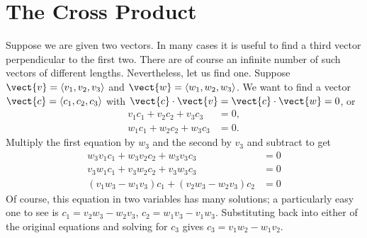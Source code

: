 \section{The Cross Product}\label{sec:3Dcrossproduct}

Suppose we are given two vectors. In many cases it is useful to find a third vector
perpendicular to the first two. There are of course an infinite number
of such vectors of different lengths. Nevertheless, let us find one.
Suppose $\vect{v}=\langle v_1,v_2,v_3\rangle$ and $\vect{w}=\langle w_1,w_2,w_3\rangle$. We want
to find a vector $\vect{c} = \langle c_1,c_2,c_3\rangle$ with
$\vect{c}\cdot\vect{v}=\vect{c}\cdot\vect{ w}=0$, or
\begin{align*}
  v_1c_1+v_2c_2+v_3c_3&=0,	\\
  w_1c_1+w_2c_2+w_3c_3&=0.
\end{align*}
Multiply the first equation by $w_3$ and the second by $v_3$ and
subtract to get
\begin{align*}
  w_3v_1c_1+w_3v_2c_2+w_3v_3c_3&=0	\\
  v_3w_1c_1+v_3w_2c_2+v_3w_3c_3&=0	\\
  (v_1w_3-w_1v_3)c_1 + (v_2w_3-w_2v_3)c_2&=0
\end{align*}
Of course, this equation in two variables has many solutions; a
particularly easy one to see is $c_1=v_2w_3-w_2v_3$,
$c_2=w_1v_3-v_1w_3$. Substituting back into either of the original
equations and solving for $ c_3$ gives $c_3=v_1w_2-w_1v_2$.

